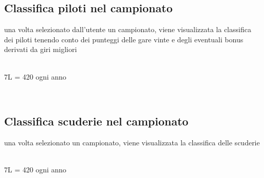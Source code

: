 \documentclass[a4paper,12pt]{report}
\begin{document}
	\subsection{Classifica piloti nel campionato}
	una volta selezionato dall'utente un campionato, viene visualizzata la classifica dei piloti
	tenendo conto dei punteggi delle gare vinte e degli eventuali bonus derivati da giri migliori
	\begin{table}[!htb]
		\centering
		\begin{center}
		\newline\\
		7L = 420 ogni anno\\
		\end{center}
	\end{table}\\
	\subsection{Classifica scuderie nel campionato}
	una volta selezionato un campionato, viene visualizzata la classifica delle scuderie
	\begin{table}[!htb]
		\centering
		\begin{center}
		\newline\\
		7L = 420 ogni anno\\
		\end{center}
	\end{table}\\
\end{document}
